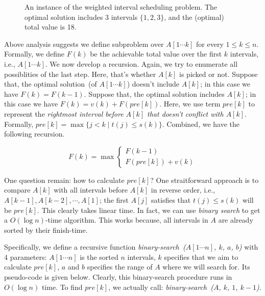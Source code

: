 \documentclass[letterpaper,11pt]{article}
\theoremstyle{mytheorem}
\begin{document}
\begin{figure}[h]
\centering{}
\caption{An instance of the weighted interval scheduling problem.
The optimal solution includes 3 intervals $\{1, 2, 3\}$,
and the (optimal) total value is 18.}
\label{fig:order}
\end{figure}


Above analysis suggests we define subproblem over $A[1\cdots k]$ for every $1\le k \le n$.
Formally, we define $F(k)$ be the achievable total value over the first $k$ intervals, i.e., $A[1\cdots k]$.
We now develop a recursion. Again, we try to enumerate all possiblities of the last step.
Here, that's whether $A[k]$ is picked or not. Suppose that, the optimal solution~(of $A[1\cdots k]$)
doesn't include $A[k]$; in this case we have $F(k) = F(k-1)$.
Suppose that, the optimal solution includes $A[k]$; in this case we have $F(k) = v(k) + F(pre[k])$.
Here, we use term $pre[k]$ to represent the \emph{rightmost interval before $A[k]$ that doesn't conflict with $A[k]$}.
Formally, $pre[k] = \max\{j < k \mid t(j) \le s(k)\}$.
Combined, we have the following recursion.

\begin{displaymath}
F(k) = \max\left\{
	\begin{array}{lll}
		F(k-1) \\
		F(pre[k]) + v(k)
	\end{array}
\right.
\end{displaymath}

One question remain: how to calculate $pre[k]$? One straitforward approach is to 
compare $A[k]$ with all intervals before $A[k]$ in reverse order, i.e., $A[k-1], A[k-2], \cdots, A[1]$;
the first $A[j]$ satisfies that $t(j) \le s(k)$ will be $pre[k]$. 
This clearly takes linear time. In fact, we can use \emph{binary search} to get a $O(\log n)$-time algorithm.
This works because, all intervals in $A$ are already sorted by their finish-time.

Specifically, we define a recursive function \emph{binary-search~($A[1\cdots n]$, $k$, $a$, $b$)}
with 4 parameters: $A[1\cdots n]$ is the sorted $n$ intervals, $k$ specifies that we aim to calculate $pre[k]$,
$a$ and $b$ specifies the range of $A$ where we will search for. 
Its pseudo-code is given below.
Clearly, this binary-search procedure runs in $O(\log n)$ time.
To find $pre[k]$, we actually call: \emph{binary-search~($A$, $k$, $1$, $k-1$)}.
\end{document}

